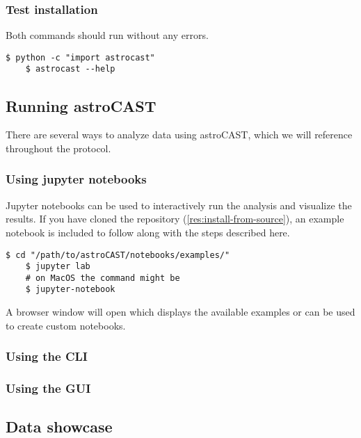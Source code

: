 \subsubsection{Test installation}

Both commands should run without any errors.

\begin{lstlisting}[style=bashStyle]
    $ python -c "import astrocast"
    $ astrocast --help
\end{lstlisting}

\subsection{Running astroCAST}

There are several ways to analyze data using \ac{astroCAST}, which we will reference throughout the protocol.

\subsubsection{Using jupyter notebooks}

Jupyter notebooks can be used to interactively run the analysis and visualize the results.
If you have cloned the repository (\ref{res:install-from-source}), an example notebook is included to follow along with the steps described here.

\begin{lstlisting}[style=bashStyle]
    $ cd "/path/to/astroCAST/notebooks/examples/"
    $ jupyter lab
    # on MacOS the command might be
    $ jupyter-notebook
\end{lstlisting}

A browser window will open which displays the available examples or can be used to create custom notebooks.

\subsubsection{Using the \ac{CLI}}

\subsubsection{Using the \ac{GUI}}

\subsection{Data showcase}

